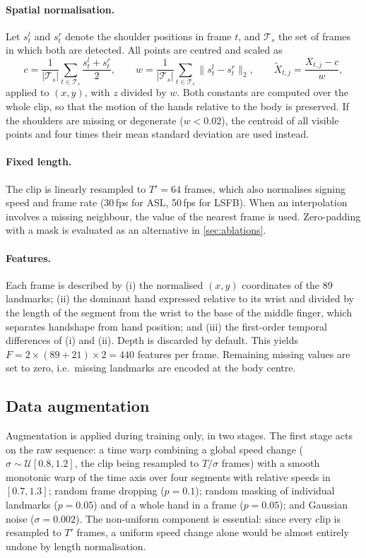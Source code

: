 \paragraph{Spatial normalisation.} Let $s^{l}_t$ and $s^{r}_t$ denote the shoulder positions in
frame $t$, and $\mathcal{T}_s$ the set of frames in which both are detected. All points are
centred and scaled as
\begin{equation}
  c = \frac{1}{|\mathcal{T}_s|}\sum_{t\in\mathcal{T}_s}\frac{s^{l}_t+s^{r}_t}{2}, \qquad
  w = \frac{1}{|\mathcal{T}_s|}\sum_{t\in\mathcal{T}_s}\lVert s^{l}_t-s^{r}_t\rVert_2, \qquad
  \tilde{X}_{t,j} = \frac{X_{t,j}-c}{w},
\end{equation}
applied to $(x,y)$, with $z$ divided by $w$. Both constants are computed over the whole clip, so
that the motion of the hands relative to the body is preserved. If the shoulders are missing or
degenerate ($w<0.02$), the centroid of all visible points and four times their mean standard
deviation are used instead.

\paragraph{Fixed length.} The clip is linearly resampled to $T'=64$ frames, which also normalises
signing speed and frame rate (30\,fps for ASL, 50\,fps for LSFB). When an interpolation involves a
missing neighbour, the value of the nearest frame is used. Zero-padding with a mask is evaluated as
an alternative in \cref{sec:ablations}.

\paragraph{Features.} Each frame is described by (i) the normalised $(x,y)$ coordinates of the 89
landmarks; (ii) the dominant hand expressed relative to its wrist and divided by the length of the
segment from the wrist to the base of the middle finger, which separates handshape from hand
position; and (iii) the first-order temporal differences of (i) and (ii). Depth is discarded by
default. This yields $F = 2\times(89+21)\times2 = 440$ features per frame. Remaining missing values
are set to zero, i.e.\ missing landmarks are encoded at the body centre.

\subsection{Data augmentation}
Augmentation is applied during training only, in two stages. The first stage acts on the raw
sequence: a time warp combining a global speed change ($\sigma\sim\mathcal{U}[0.8,1.2]$, the clip
being resampled to $T/\sigma$ frames) with a smooth monotonic warp of the time axis over four
segments with relative speeds in $[0.7,1.3]$; random frame dropping ($p=0.1$); random masking of
individual landmarks ($p=0.05$) and of a whole hand in a frame ($p=0.05$); and Gaussian noise
($\sigma=0.002$). The non-uniform component is essential: since every clip is resampled to $T'$
frames, a uniform speed change alone would be almost entirely undone by length normalisation.

